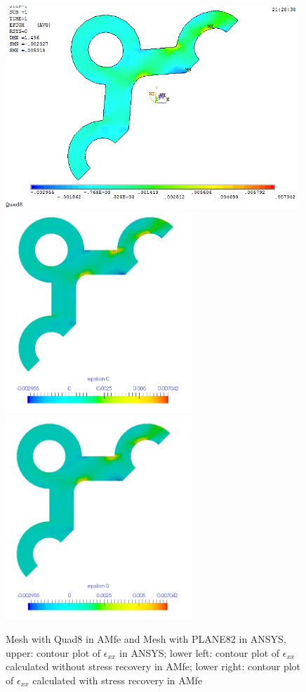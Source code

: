 \begin{figure}[htbp]
	\begin{center}
		\includegraphics[width=11cm,clip]{Quad8_Exx.png} 	
		\includegraphics[width=7cm,clip]{Quad8_Exx_PD.png} 	
		\includegraphics[width=7cm,clip]{Quad8_Exx_P.png} 		
		\caption{Mesh with Quad8 in AMfe and Mesh with PLANE82 in ANSYS, upper: contour plot of $\epsilon_{xx}$ in ANSYS; lower left: contour plot of $\epsilon_{xx}$ calculated without stress recovery in AMfe; lower right: contour plot of $\epsilon_{xx}$ calculated with stress recovery in AMfe} \label{fig: Quad8_Exx}
	\end{center}
\end{figure}
\clearpage 

